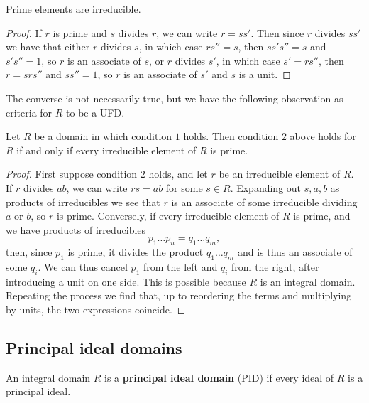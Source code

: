 \begin{lemma}
Prime elements are irreducible.
\end{lemma}

\begin{proof}
If $ r $ is prime and $ s $ divides $ r $, we can write $ r = ss' $. Then since $ r $ divides $ ss' $ we have that either $ r $ divides $ s $, in which case $ rs'' = s $, then $ ss's'' = s $ and $ s's'' = 1 $, so $ r $ is an associate of $ s $, or $ r $ divides $ s' $, in which case $ s' = rs'' $, then $ r = srs'' $ and $ ss'' = 1 $, so $ r $ is an associate of $ s' $ and $ s $ is a unit.
\end{proof}

The converse is not necessarily true, but we have the following observation as criteria for $ R $ to be a UFD.

\begin{proposition}
Let $ R $ be a domain in which condition $ 1 $ holds. Then condition $ 2 $ above holds for $ R $ if and only if every irreducible element of $ R $ is prime.
\end{proposition}

\begin{proof}
First suppose condition $ 2 $ holds, and let $ r $ be an irreducible element of $ R $. If $ r $ divides $ ab $, we can write $ rs = ab $ for some $ s \in R $. Expanding out $ s, a, b $ as products of irreducibles we see that $ r $ is an associate of some irreducible dividing $ a $ or $ b $, so $ r $ is prime. Conversely, if every irreducible element of $ R $ is prime, and we have products of irreducibles
$$ p_1 \dots p_n = q_1 \dots q_m, $$
then, since $ p_1 $ is prime, it divides the product $ q_1 \dots q_m $ and is thus an associate of some $ q_i $. We can thus cancel $ p_1 $ from the left and $ q_i $ from the right, after introducing a unit on one side. This is possible because $ R $ is an integral domain. Repeating the process we find that, up to reordering the terms and multiplying by units, the two expressions coincide.
\end{proof}

\subsection{Principal ideal domains}

\begin{definition}
An integral domain $ R $ is a \textbf{principal ideal domain} (PID) if every ideal of $ R $ is a principal ideal.
\end{definition}

